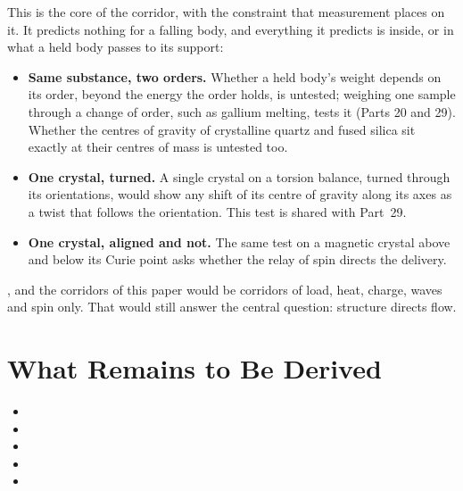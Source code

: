 \documentclass[11pt,a4paper]{article}
\begin{document}
This is the core of the corridor, with the constraint that measurement places on it. It predicts nothing for a falling body, and everything it predicts is inside, or in what a held body passes to its support:
\begin{itemize}
\item \textbf{Same substance, two orders.} Whether a held body's weight depends on its order, beyond the energy the order holds, is untested; weighing one sample through a change of order, such as gallium melting, tests it (Parts 20 and 29). Whether the centres of gravity of crystalline quartz and fused silica sit exactly at their centres of mass is untested too.
\item \textbf{One crystal, turned.} A single crystal on a torsion balance, turned through its orientations, would show any shift of its centre of gravity along its axes as a twist that follows the orientation. This test is shared with Part~29.
\item \textbf{One crystal, aligned and not.} The same test on a magnetic crystal above and below its Curie point asks whether the relay of spin directs the delivery.
\end{itemize}
, and the corridors of this paper would be corridors of load, heat, charge, waves and spin only. That would still answer the central question: structure directs flow.

\section{What Remains to Be Derived}
\label{sec:owed}

\begin{itemize}
\item {}
\item {}
\item {}
\item {}
\item {}
\end{itemize}
\end{document}
